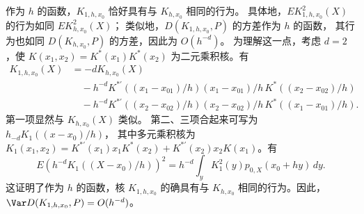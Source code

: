 作为 $h$ 的函数，$K_{1,h,x_0}$ 恰好具有与 $K_{h,x_0}$ 相同的行为。
具体地，$EK_{1,h,x_0}^2(X)$ 的行为如同 $EK_{h,x_0}^2(X)$；
类似地，$D(K_{1,h,x_0},P)$ 的方差作为 $h$ 的函数，
其行为也如同 $D(K_{h,x_0},P)$ 的方差，因此为 $O(h^{-d})$。
为理解这一点，考虑 $d=2$，使
$K(x_1,x_2)=K^*(x_1)K^*(x_2)$ 为二元乘积核。有
\[
\begin{aligned}
 K_{1,h,x_0}(X)
 &=-dK_{h,x_0}(X)\\
 &\quad-h^{-d}K^{*\prime}((x_1-x_{01})/h)
 (x_1-x_{01})/h\,K^*((x_2-x_{02})/h)\\
 &\quad-h^{-d}K^{*\prime}((x_2-x_{02})/h)
 (x_2-x_{02})/h\,K^*((x_1-x_{01})/h).
\end{aligned}
\]
第一项显然与 $K_{h,x_0}(X)$ 类似。
第二、三项合起来可写为 $h_{-d}K_1((x-x_0)/h)$，
其中多元乘积核为
$K_1(x_1,x_2)=K^{*\prime}(x_1)x_1K^*(x_2)
+K^{*\prime}(x_2)x_2K(x_1)$。有
\[
 E(h^{-d}K_1((X-x_0)/h))^2
 =h^{-d}\int_yK_1^2(y)p_{0,X}(x_0+hy)\,dy.
\]
这证明了作为 $h$ 的函数，核 $K_{1,h,x_0}$ 的确具有与
$K_{h,x_0}$ 相同的行为。因此，$\Var D(K_{1,h,x_0},P)=O(h^{-d})$。

